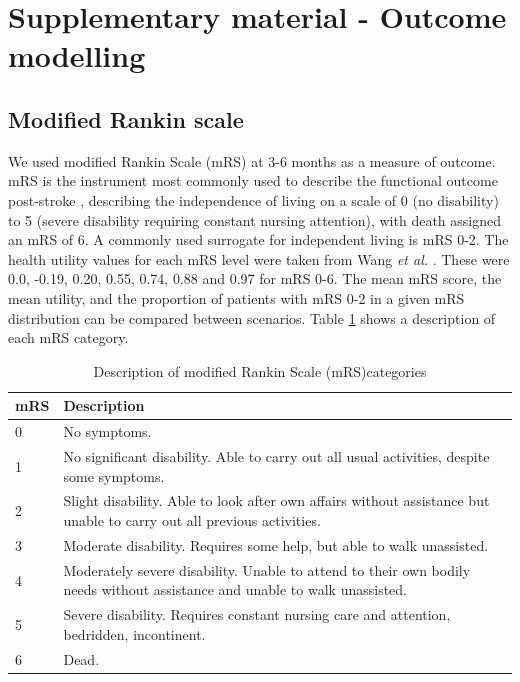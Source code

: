 
\section{Supplementary material - Outcome modelling}

\subsection{Modified Rankin scale}

We used modified Rankin Scale (mRS) at 3-6 months as a measure of outcome. mRS is the instrument most commonly used to describe the functional outcome post-stroke \cite{quinn_functional_2009}, describing the independence of living on a scale of 0 (no disability) to 5 (severe disability requiring constant nursing attention), with death assigned an mRS of 6. A commonly used surrogate for independent living is mRS 0-2. The health utility values for each mRS level were taken from Wang \textit{et al.} \cite{wang_utility-weighted_2020}. These were 0.0, -0.19, 0.20, 0.55, 0.74, 0.88 and 0.97 for mRS 0-6. The mean mRS score, the mean utility, and the proportion of patients with mRS 0-2 in a given mRS distribution can be compared between scenarios. Table \ref{tab:mrs} shows a description of each mRS category.

\begin{minipage}{1.0\textwidth}  %
\begin{longtable}{p{1.2cm} p{13cm}}
\caption{Description of modified Rankin Scale (mRS)categories}\label{tab:mrs}\\
\toprule
mRS & Description \\
\midrule
0 & No symptoms. \\
1 & No significant disability. Able to carry out all usual activities, despite some symptoms.\\
2 & Slight disability. Able to look after own affairs without assistance but unable to carry out all previous activities. \\
3 & Moderate disability. Requires some help, but able to walk unassisted.\\
4 & Moderately severe disability. Unable to attend to their own bodily needs without assistance and unable to walk unassisted. \\
5 & Severe disability. Requires constant nursing care and attention,
bedridden, incontinent.\\
6 & Dead.\\
\bottomrule
\end{longtable}
\end{minipage} 


